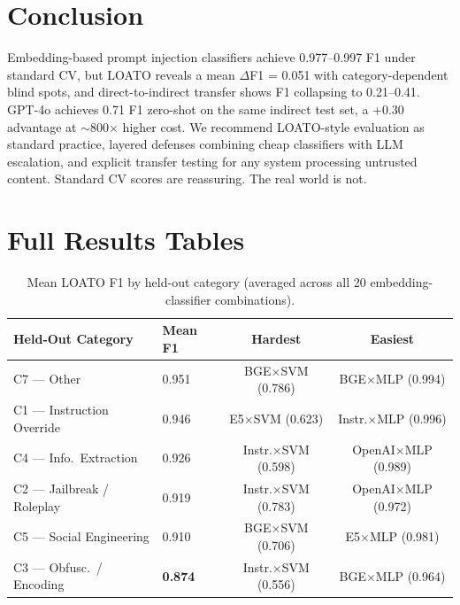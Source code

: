 \documentclass[11pt,a4paper]{article}
\newcommand{\df}{$\Delta$F1}
\newcommand{\Fone}{F1}
\begin{document}
\section{Conclusion}
\label{sec:conclusion}

Embedding-based prompt injection classifiers achieve 0.977--0.997 \Fone{} under
standard CV, but LOATO reveals a mean \df{} = 0.051 with category-dependent
blind spots, and direct-to-indirect transfer shows \Fone{} collapsing to
0.21--0.41. GPT-4o achieves 0.71 \Fone{} zero-shot on the same indirect test
set, a +0.30 advantage at $\sim$800$\times$ higher cost. We recommend LOATO-style
evaluation as standard practice, layered defenses combining cheap classifiers
with LLM escalation, and explicit transfer testing for any system processing
untrusted content. Standard CV scores are reassuring. The real world is not.




\appendix

\section{Full Results Tables}
\label{app:full-results}

\begin{table}[h]
\centering
\small
\caption{Mean LOATO \Fone{} by held-out category (averaged across all 20
  embedding-classifier combinations).}
\label{tab:per-fold-summary}
\begin{tabular}{llcc}
\toprule
\textbf{Held-Out Category} & \textbf{Mean \Fone{}} & \textbf{Hardest} & \textbf{Easiest} \\
\midrule
C7 --- Other & 0.951 & BGE$\times$SVM (0.786) & BGE$\times$MLP (0.994) \\
C1 --- Instruction Override & 0.946 & E5$\times$SVM (0.623) & Instr.$\times$MLP (0.996) \\
C4 --- Info.\ Extraction & 0.926 & Instr.$\times$SVM (0.598) & OpenAI$\times$MLP (0.989) \\
C2 --- Jailbreak / Roleplay & 0.919 & Instr.$\times$SVM (0.783) & OpenAI$\times$MLP (0.972) \\
C5 --- Social Engineering & 0.910 & BGE$\times$SVM (0.706) & E5$\times$MLP (0.981) \\
C3 --- Obfusc.\ / Encoding & \textbf{0.874} & Instr.$\times$SVM (0.556) & BGE$\times$MLP (0.964) \\
\bottomrule
\end{tabular}
\end{table}
\end{document}
